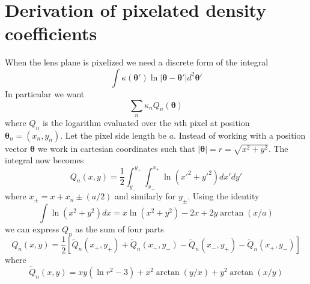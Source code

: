 \documentclass[galley,usenatbib]{mn2e}
\renewcommand{\vec}[1]{\ensuremath{\boldsymbol{#1}}}
\begin{document}
\section{Derivation of pixelated density coefficients}
\label{Q derivation}
When the lens plane is pixelized we need a discrete form of the integral
%
\[\int \kappa(\vec\theta') \ln |\vec\theta-\vec\theta'| d^2\vec\theta' \]
%
In particular we want
%
\[\sum_n \kappa_n Q_n(\vec\theta)\]
%
where $Q_n$ is the logarithm evaluated over the $n$th pixel at position $\vec\theta_n = (x_n, y_n)$. Let the pixel side length be $a$.
Instead of working with a position vector $\vec\theta$ we work in cartesian coordinates such that
%
$|\vec\theta| = r = \sqrt{x^2 + y^2}$. The integral now becomes
%
\[Q_n(x,y) = \frac12 \int_{y_-}^{y_+}\int_{x_-}^{x_+} \ln (x'^2+y'^2) dx' dy'\]
%
where $x_\pm = x + x_n \pm (a/2)$ and similarly for $y_\pm$.
Using the identity
%
\[\int \ln(x^2+y^2) dx = x \ln(x^2+y^2) - 2x + 2y\arctan(x/a) \]
%
we can express $Q_n$ as the sum of four parts
%
\[Q_n(x,y) = \frac12 \left[ \tilde Q_n(x_+,y_+)
        + \tilde Q_n(x_-,y_-)
        - \tilde Q_n(x_-,y_+)
        - \tilde Q_n(x_+,y_-) \right]\]
%
where
%
\[\tilde Q_n(x,y) = xy(\ln r^2 - 3) + x^2\arctan(y/x) + y^2\arctan(x/y)\]



\end{document}
